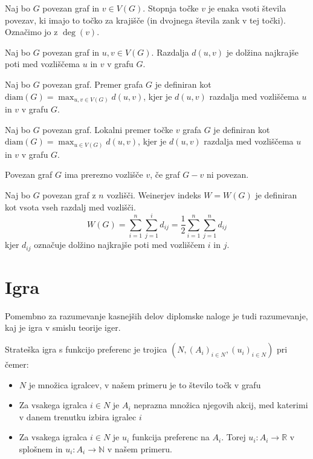 \documentclass[fin1, tisk]{fmfdelo}
\begin{document}
\begin{definicija}
Naj bo \(G\) povezan graf in \(v \in V(G)\). Stopnja točke \(v\) je enaka vsoti števila povezav, ki imajo to točko za krajišče (in dvojnega števila zank v tej točki). Označimo jo z \(\deg(v)\).
\end{definicija}

\begin{definicija}
Naj bo \(G\) povezan graf in \(u, v \in V(G)\). Razdalja \(d(u, v)\) je dolžina najkrajše poti med vozliščema \(u\) in \(v\) v grafu \(G\).
\end{definicija}

\begin{definicija}
Naj bo \(G\) povezan graf. Premer grafa \(G\) je definiran kot \(\text{diam}(G) = \max_{u, v \in V(G)} d(u, v)\), kjer je \(d(u, v)\) razdalja med vozliščema \(u\) in \(v\) v grafu \(G\).
\end{definicija}

\begin{definicija}
Naj bo \(G\) povezan graf. Lokalni premer točke \(v\) grafa \(G\) je definiran kot \(\text{diam}(G) = \max_{u \in V(G)} d(u, v)\), kjer je \(d(u, v)\) razdalja med vozliščema \(u\) in \(v\) v grafu \(G\).
\end{definicija}

\begin{definicija}
Povezan graf \(G\) ima prerezno vozlišče \(v\), če graf \(G - v\) ni povezan.
\end{definicija}

\begin{definicija}
Naj bo \(G\) povezan graf z \(n\) vozlišči. Weinerjev indeks \(W = W(G)\) je definiran kot vsota vseh razdalj med vozlišči.
\[
W(G) = \sum_{i=1}^{n} \sum_{j=1}^{i} d_{ij} = \frac{1}{2} \sum_{i=1}^{n} \sum_{j=1}^{n} d_{ij}
\]
kjer \(d_{ij}\) označuje dolžino najkrajše poti med vozliščem \(i\) in \(j\).
\end{definicija}

\section{Igra}

Pomembno za razumevanje kasnejših delov diplomske naloge je tudi razumevanje, kaj je igra v smislu teorije iger.

\begin{definicija}
Strateška igra s funkcijo preferenc je trojica \((N, (A_i)_{i\in N}, (u_i)_{i\in N})\) pri čemer:
\begin{itemize}
    \item \(N\) je množica igralcev, v našem primeru je to število točk v grafu
    \item Za vsakega igralca \(i \in N\) je \(A_i\) neprazna množica njegovih akcij, med katerimi v danem trenutku izbira igralec \(i\)
    \item Za vsakega igralca \(i \in N\) je \(u_i\) funkcija preferenc na \(A_i\). Torej \(u_i : A_i \to \mathbb{R}\) v splošnem in \(u_i : A_i \to \mathbb{N}\) v našem primeru.
\end{itemize}
\end{definicija}
\end{document}
